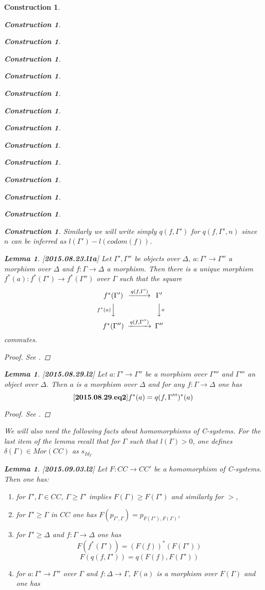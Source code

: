 \documentclass[12pt]{amsart}
\newenvironment{eq}{\begin{equation}}{\end{equation}}
\newtheorem{lemma}[proposition]{Lemma}
\newtheorem{construction}[proposition]{Construction}
\newcommand{\llabel}[1]{\label{#1}[{\bf #1}]}
\newcommand{\sr}{\rightarrow}
\begin{document}
\begin{construction}
\begin{construction}
\begin{construction}
\begin{construction}
\begin{construction}
\begin{construction}
\begin{construction}
\begin{construction}
\begin{construction}
\begin{construction}
\begin{construction}
\begin{construction}
\begin{construction}
\begin{construction}
Similarly we will write simply $q(f,\Gamma')$ for $q(f,\Gamma',n)$ since $n$ can be inferred as $l(\Gamma')-l(codom(f))$. 
%
\begin{lemma}
\llabel{2015.08.23.l1a}
Let $\Gamma',\Gamma''$ be objects over $\Delta$, $a:\Gamma'\sr \Gamma''$ a morphism over $\Delta$ and $f:\Gamma\sr\Delta$ a morphism. Then there is a unique morphism $f^*(a):f^*(\Gamma')\sr f^*(\Gamma'')$ over $\Gamma$ such that the square
%
$$
\begin{CD}
f^*(\Gamma') @>q(f,\Gamma')>> \Gamma'\\
@Vf^*(a)VV @VVaV\\
f^*(\Gamma'') @>q(f,\Gamma'')>> \Gamma''
\end{CD}
$$
%
commutes.
\end{lemma}
%
\begin{proof}
See \cite[Lemma 2.13]{fromunivwithPiI}.
\end{proof}
%
\begin{lemma}
\llabel{2015.08.29.l2}
Let $a:\Gamma'\sr\Gamma''$ be a morphism over $\Gamma'''$ and $\Gamma'''$ an object over $\Delta$. Then $a$ is a morphism over $\Delta$ and for any $f:\Gamma\sr \Delta$ one has
%
\begin{eq}\llabel{2015.08.29.eq2}
f^*(a)=q(f,\Gamma''')^*(a)
\end{eq}
%
\end{lemma}
%
\begin{proof}
See \cite[Lemma 2.15]{fromunivwithPiI}.
\end{proof}
%
We will also need the following facts about homomorphisms of C-systems. For the last item of the lemma recall that for $\Gamma$ such that $l(\Gamma)>0$,  one defines $\delta(\Gamma)\in Mor(CC)$ as $s_{Id_{\Gamma}}$
%
\begin{lemma}
\llabel{2015.09.03.l2}
Let $F:CC\sr CC'$ be a homomorphism of C-systems. Then one has:
%
\begin{enumerate}
\item for $\Gamma',\Gamma\in CC$, $\Gamma\ge \Gamma'$ implies $F(\Gamma)\ge F(\Gamma')$ and similarly for $>$,
\item for $\Gamma'\ge \Gamma$ in $CC$ one has $F(p_{\Gamma',\Gamma})=p_{F(\Gamma'),F(\Gamma)}$,
\item for $\Gamma'\ge \Delta$ and $f:\Gamma\sr \Delta$ one has
%
$$F(f^*(\Gamma'))=(F(f))^*(F(\Gamma'))$$
$$F(q(f,\Gamma'))=q(F(f),F(\Gamma'))$$
%
\item for $a:\Gamma'\sr \Gamma''$ over $\Gamma$ and $f:\Delta\sr \Gamma$, $F(a)$ is a morphism over $F(\Gamma)$ and one has

\end{enumerate}
\end{lemma}
\end{construction}
\end{construction}
\end{construction}
\end{construction}
\end{construction}
\end{construction}
\end{construction}
\end{construction}
\end{construction}
\end{construction}
\end{construction}
\end{construction}
\end{construction}
\end{construction}
\end{document}
